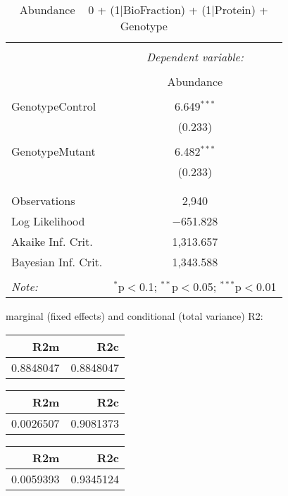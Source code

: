 \documentclass[11pt]{report}
\begin{document}
\begin{table}[!htbp] \centering 
  \caption{Abundance ~ 0 + (1|BioFraction) + (1|Protein) + Genotype} 
  \label{} 
\begin{tabular}{@{\extracolsep{5pt}}lc} 
\\[-1.8ex]\hline 
\hline \\[-1.8ex] 
 & \multicolumn{1}{c}{\textit{Dependent variable:}} \\ 
\cline{2-2} 
\\[-1.8ex] & Abundance \\ 
\hline \\[-1.8ex] 
 GenotypeControl & 6.649$^{***}$ \\ 
  & (0.233) \\ 
  & \\ 
 GenotypeMutant & 6.482$^{***}$ \\ 
  & (0.233) \\ 
  & \\ 
\hline \\[-1.8ex] 
Observations & 2,940 \\ 
Log Likelihood & $-$651.828 \\ 
Akaike Inf. Crit. & 1,313.657 \\ 
Bayesian Inf. Crit. & 1,343.588 \\ 
\hline 
\hline \\[-1.8ex] 
\textit{Note:}  & \multicolumn{1}{r}{$^{*}$p$<$0.1; $^{**}$p$<$0.05; $^{***}$p$<$0.01} \\ 
\end{tabular} 
\end{table} 
marginal (fixed effects) and conditional (total variance) R2:

\begin{tabular}{r|r}
\hline
R2m & R2c\\
\hline
0.8848047 & 0.8848047\\
\hline
\end{tabular}

\begin{tabular}{r|r}
\hline
R2m & R2c\\
\hline
0.0026507 & 0.9081373\\
\hline
\end{tabular}

\begin{tabular}{r|r}
\hline
R2m & R2c\\
\hline
0.0059393 & 0.9345124\\
\hline
\end{tabular}
\end{document}
